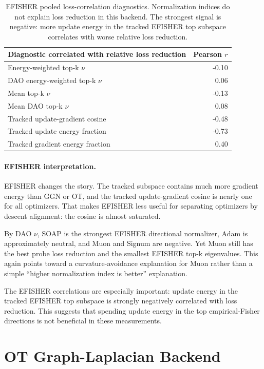 \documentclass[11pt]{article}
\begin{document}
\begin{table}[htbp]
\centering
\small
\begin{tabular}{lr}
\toprule
Diagnostic correlated with relative loss reduction & Pearson $r$ \\
\midrule
Energy-weighted top-k $\nu$ & -0.10 \\
DAO energy-weighted top-k $\nu$ & 0.06 \\
Mean top-k $\nu$ & -0.13 \\
Mean DAO top-k $\nu$ & 0.08 \\
Tracked update-gradient cosine & -0.48 \\
Tracked update energy fraction & -0.73 \\
Tracked gradient energy fraction & 0.40 \\
\bottomrule
\end{tabular}
\caption{EFISHER pooled loss-correlation diagnostics. Normalization indices do not explain loss reduction in this backend. The strongest signal is negative: more update energy in the tracked EFISHER top subspace correlates with worse relative loss reduction.}
\label{tab:efisher-correlations}
\end{table}

\paragraph{EFISHER interpretation.}
EFISHER changes the story. The tracked subspace contains much more gradient
energy than GGN or OT, and the tracked update-gradient cosine is nearly one for
all optimizers. That makes EFISHER less useful for separating optimizers by
descent alignment: the cosine is almost saturated.

By DAO $\nu$, SOAP is the strongest EFISHER directional normalizer, Adam is
approximately neutral, and Muon and Signum are negative. Yet Muon still has the
best probe loss reduction and the smallest EFISHER top-k eigenvalues. This
again points toward a curvature-avoidance explanation for Muon rather than a
simple ``higher normalization index is better'' explanation.

The EFISHER correlations are especially important: update energy in the tracked
EFISHER top subspace is strongly negatively correlated with loss reduction.
This suggests that spending update energy in the top empirical-Fisher
directions is not beneficial in these measurements.

\FloatBarrier

\section{OT Graph-Laplacian Backend}
\end{document}
